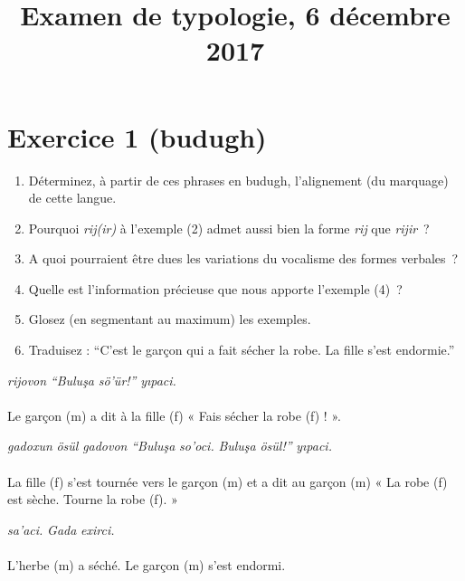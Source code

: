 \documentclass[oldfontcommands,twoside,a4paper,12pt]{article}
\newcommand{\ipa}[1]{{\phon\textit{#1}}}
\begin{document}
\title{Examen de typologie, 6 décembre 2017}
\date{}
\maketitle
\section*{Exercice 1 (budugh)}

 \begin{enumerate}
  \item Déterminez, à partir de ces phrases en budugh, l'alignement (du marquage) de cette langue.
  \item Pourquoi \ipa{rij(ir)} à l'exemple (2) admet aussi bien la forme \ipa{rij} que \ipa{rijir}~?
  \item A quoi pourraient être dues les variations du vocalisme des formes verbales~?
  \item Quelle est l'information précieuse que nous apporte l'exemple (4)~?
  \item Glosez (en segmentant au maximum) les exemples.
  \item Traduisez : ``C’est le garçon qui a fait sécher la robe. La fille s’est endormie.''

\end{enumerate}

\vspace{0.5cm}

\begin{exe}
\ex
\gll \ipa{Gada’r} \ipa{rijovon} \ipa{``Buluşa} \ipa{ sö’ür!''} \ipa{yıpaci.}\\
\\
\glt Le garçon (m) a dit à la fille (f) « Fais sécher la robe (f) ! ».
\end{exe}

\begin{exe}
\ex
\gll \ipa{Rij(ir)} \ipa{gadoxun} \ipa{ösül} \ipa{gadovon} \ipa{``Buluşa} \ipa{so’oci.} \ipa{Buluşa} \ipa{ ösül!''} \ipa{yıpaci.}\\
\\
\glt La fille (f) s’est tournée vers le garçon (m) et a dit au garçon (m) « La robe (f) est sèche. Tourne la robe (f). »
\end{exe}

\begin{exe}
\ex
\gll \ipa{Xhın} \ipa{sa’aci.} \ipa{Gada} \ipa{exirci.}\\
\\
\glt L’herbe (m) a séché. Le garçon (m) s’est endormi.
\end{exe}
\end{document}
